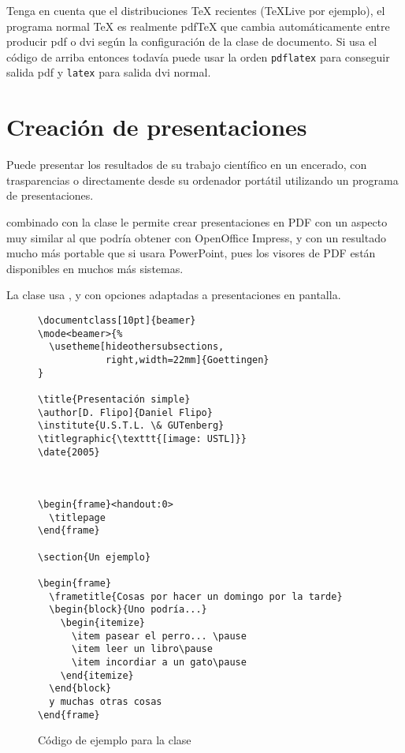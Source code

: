 Tenga en cuenta que el distribuciones \TeX{} recientes (\TeX{}Live por
ejemplo), el programa normal \TeX{} es realmente pdf\TeX{} que cambia
automáticamente entre producir pdf o dvi según la configuración de la
clase de documento.  Si usa el código de arriba entonces todavía puede
usar la orden \verb|pdflatex| para conseguir salida pdf y
\verb|latex| para salida dvi normal.


\section{Creación de presentaciones}
\label{sec:beamer}
Puede presentar los resultados de su trabajo científico en un
encerado, con trasparencias o directamente desde su ordenador portátil
utilizando un programa de presentaciones.

 combinado con la clase  le permite crear
presentaciones en PDF con un aspecto muy similar al que podría obtener
con OpenOffice Impress, y con un resultado mucho más portable que si
usara PowerPoint, pues los visores de PDF están disponibles en muchos
más sistemas.

La clase  usa ,  y
 con opciones adaptadas a presentaciones en pantalla.

\begin{figure}[htbp]
\begin{verbatim}
\documentclass[10pt]{beamer}
\mode<beamer>{%
  \usetheme[hideothersubsections,
            right,width=22mm]{Goettingen}
}

\title{Presentación simple}
\author[D. Flipo]{Daniel Flipo}
\institute{U.S.T.L. \& GUTenberg}
\titlegraphic{\texttt{[image: USTL]}}
\date{2005}



\begin{frame}<handout:0>
  \titlepage
\end{frame}

\section{Un ejemplo}

\begin{frame}
  \frametitle{Cosas por hacer un domingo por la tarde}
  \begin{block}{Uno podría...}
    \begin{itemize}
      \item pasear el perro... \pause
      \item leer un libro\pause
      \item incordiar a un gato\pause
    \end{itemize}
  \end{block}
  y muchas otras cosas
\end{frame}

\end{verbatim}
  \caption{Código de ejemplo para la clase }
  \label{fig:code-beamer}
\end{figure}


